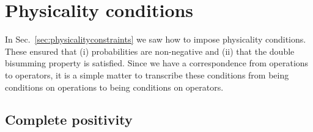 \documentclass[10pt]{article}
\begin{document}
\section{Physicality conditions}\label{sec:physicalityconditionsoperators}


In Sec.\ \ref{sec:physicalityconstraints} we saw how to impose physicality conditions. These ensured that (i) probabilities are non-negative and (ii) that the double bisumming property is satisfied.   Since we have a correspondence from operations to operators, it is a simple matter to transcribe these conditions from being conditions on operations to being conditions on operators.

\subsection{Complete positivity}\label{sec:completeoperatorpositivity}
\end{document}

